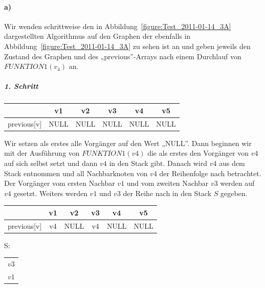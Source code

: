 \documentclass[a4paper, 12pt]{article}
\begin{document}
\paragraph{a)}

Wir wenden schrittweise den in Abbildung~\ref{figure:Test_2011-01-14_3A}  dargestellten Algorithmus auf den Graphen der ebenfalls in Abbildung~\ref{figure:Test_2011-01-14_3A} zu sehen ist an und geben jeweils den Zustand des Graphen und des „previous”-Arrays nach einem Durchlauf von $FUNKTION1(v_4)$ an.

\subparagraph{1. Schritt}

\begin{center}
	\begin{tabular}{lccccc}
					& v1	& v2	& v3	& v4	& v5\\
		\hline
		previous[v] & NULL	& NULL	& NULL	& NULL	&  NULL
	\end{tabular}
\end{center}

Wir setzen als erstes alle Vorgänger auf den Wert „NULL”. Dann beginnen wir mit der Ausführung von $FUNKTION1(v4)$ die als erstes den Vorgänger von $v4$ auf sich selbst setzt und dann $v4$ in den Stack gibt. Danach wird $v4$ aus dem Stack entnommen und all Nachbarknoten von $v4$ der Reihenfolge nach betrachtet.\\

Der Vorgänger vom ersten Nachbar $v1$ und vom zweiten Nachbar $v3$ werden auf $v4$ gesetzt. Weiters werden $v1$ und $v3$ der Reihe nach in den Stack $S$ gegeben.\\

\begin{minipage}[b]{0.7\linewidth}
	\begin{center}
		\begin{tabular}{lccccc}
						& v1	& v2	& v3	& v4	& v5\\
			\hline
			previous[v] & v4	& NULL	& v4	& NULL	&  NULL
		\end{tabular}
	\end{center}
\end{minipage}
\begin{minipage}[b]{0.15\linewidth}
	\flushright S:~
\end{minipage}
\begin{minipage}[b]{0.15\linewidth}
	\begin{tabular}{|c|}
		$v3$\\
		$v1$\\
		\hline
	\end{tabular}
\end{minipage}\\
\end{document}
